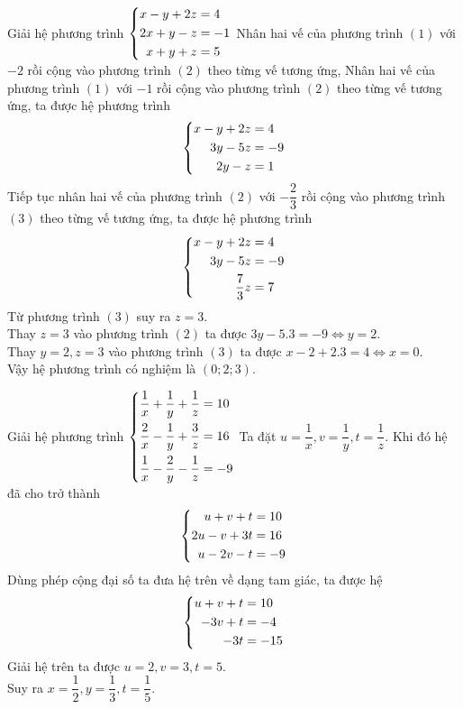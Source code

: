 \begin{vd}%
Giải hệ phương trình $\left\{\begin{aligned}x-y+2z&=4\\2x+y-z&=-1\\x+y+z&=5\end{aligned}\right.$
\loigiai
{Nhân hai vế  của phương trình $(1)$ với $-2$ rồi cộng vào phương trình $(2)$ theo từng vế tương ứng, Nhân hai vế  của phương trình $(1)$ với $-1$ rồi cộng vào phương trình $(2)$ theo từng vế tương ứng, ta được hệ phương trình
\[ \left\{\begin{aligned}x-y+2z&=4\\3y-5z&=-9\\2y-z&=1\end{aligned}\right.\]
Tiếp tục nhân hai vế  của phương trình $(2)$ với $-\dfrac{2}{3}$ rồi cộng vào phương trình $(3)$ theo từng vế tương ứng, ta được hệ phương trình
\[ \left\{\begin{aligned}x-y+2z&=4\\3y-5z&=-9\\\dfrac{7}{3}z&=7\end{aligned}\right.\]
Từ phương trình $(3)$ suy ra $z=3$.\\
Thay $z=3$ vào phương trình $(2)$ ta được $3y-5.3=-9 \Leftrightarrow y=2$.\\
Thay $y=2, z=3$ vào phương trình $(3)$ ta được $x-2+2.3=4 \Leftrightarrow x=0$.\\
Vậy hệ phương trình có nghiệm là $(0;2;3)$.}
\end{vd}

\begin{vd}%
Giải hệ phương trình $\left\{\begin{aligned}\dfrac{1}{x}+\dfrac{1}{y}+\dfrac{1}{z}&=10\\ \dfrac{2}{x}-\dfrac{1}{y}+\dfrac{3}{z}&=16\\ \dfrac{1}{x}-\dfrac{2}{y}-\dfrac{1}{z}&=-9\end{aligned}\right.$
\loigiai
{Ta đặt $u=\dfrac{1}{x}, v=\dfrac{1}{y}, t=\dfrac{1}{z}$. Khi đó hệ đã cho trở thành\\
\[\left\{\begin{aligned}u+v+t&=10\\2u-v+3t&=16\\u-2v-t&=-9\end{aligned}\right.\]
Dùng phép cộng đại số ta đưa hệ trên về dạng tam giác, ta được hệ
\[ \left\{\begin{aligned}u+v+t&=10\\-3v+t&=-4\\-3t&=-15\end{aligned}\right.\]
Giải hệ trên ta được $u=2, v=3, t=5$.\\
Suy ra $x=\dfrac{1}{2}, y=\dfrac{1}{3}, t=\dfrac{1}{5}$.}
\end{vd}

